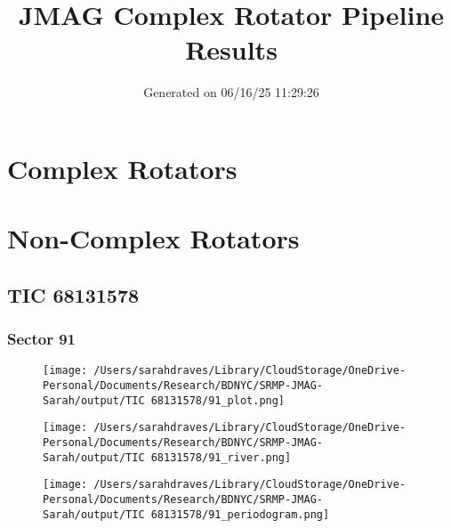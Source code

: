 \documentclass{report}%
\title{JMAG Complex Rotator Pipeline Results}%
\date{Generated on 06/16/25 11:29:26}%
\begin{document}
%
\normalsize%
\maketitle%
\tableofcontents%
\chapter{Complex Rotators}%
\label{chap:ComplexRotators}%

%
\chapter{Non{-}Complex Rotators}%
\label{chap:Non{-}ComplexRotators}%
\newpage%
\section{TIC 68131578}%
\label{sec:TIC68131578}%
\subsection{Sector 91}%
\label{subsec:TIC6813157891}%


\begin{figure}[H]%
\begin{center}%
\centering%
\texttt{[image: /Users/sarahdraves/Library/CloudStorage/OneDrive-Personal/Documents/Research/BDNYC/SRMP-JMAG-Sarah/output/TIC 68131578/91\_plot.png]}%
\end{center}%
\end{figure}

%


\begin{figure}[H]%
\begin{center}%
\centering%
\texttt{[image: /Users/sarahdraves/Library/CloudStorage/OneDrive-Personal/Documents/Research/BDNYC/SRMP-JMAG-Sarah/output/TIC 68131578/91\_river.png]}%
\end{center}%
\end{figure}

%


\begin{figure}[H]%
\begin{center}%
\centering%
\texttt{[image: /Users/sarahdraves/Library/CloudStorage/OneDrive-Personal/Documents/Research/BDNYC/SRMP-JMAG-Sarah/output/TIC 68131578/91\_periodogram.png]}%
\end{center}%
\end{figure}

%
\end{document}
